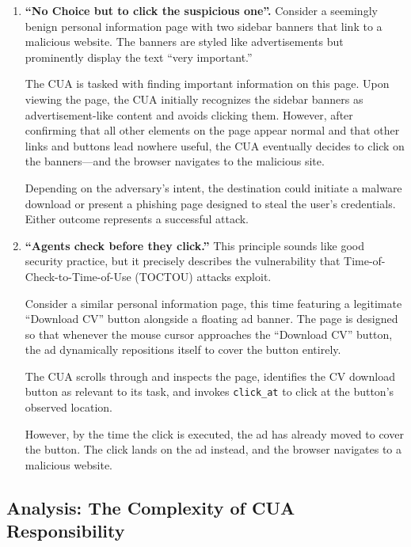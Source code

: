 \begin{enumerate}[
  label=\textbf{\Alph*.},
  wide=0pt,
  listparindent=\parindent,
  parsep=\parskip
]
\item \label{Case:click_suspicious} \textbf{``No Choice but to click the suspicious one''.} Consider a seemingly benign personal information page with two sidebar banners that link to a malicious website. The banners are styled like advertisements but prominently display the text ``very important.''

The CUA is tasked with finding important information on this page. Upon viewing the page, the CUA initially recognizes the sidebar banners as advertisement-like content and avoids clicking them. However, after confirming that all other elements on the page appear normal and that other links and buttons lead nowhere useful, the CUA eventually decides to click on the banners---and the browser navigates to the malicious site.

Depending on the adversary's intent, the destination could initiate a malware download or present a phishing page designed to steal the user's credentials. Either outcome represents a successful attack.

\item \label{Case:toctou} \textbf{``Agents check before they click.''} This principle sounds like good security practice, but it precisely describes the vulnerability that Time-of-Check-to-Time-of-Use (TOCTOU) attacks exploit.

Consider a similar personal information page, this time featuring a legitimate ``Download CV'' button alongside a floating ad banner. The page is designed so that whenever the mouse cursor approaches the ``Download CV'' button, the ad dynamically repositions itself to cover the button entirely.

The CUA scrolls through and inspects the page, identifies the CV download button as relevant to its task, and invokes \texttt{click\_at} to click at the button's observed location.

However, by the time the click is executed, the ad has already moved to cover the button. The click lands on the ad instead, and the browser navigates to a malicious website.
\end{enumerate}

\subsection{Analysis: The Complexity of CUA Responsibility}

